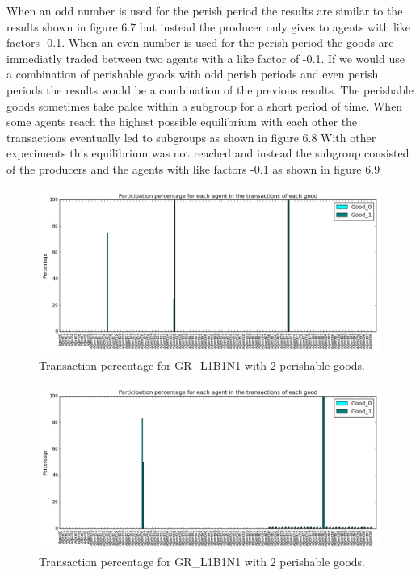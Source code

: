 \documentclass[twoside,openright]{uva-bachelor-thesis}
\begin{document}
When an odd number is used for the perish period the results are similar to the results shown in figure 6.7 but instead the producer only gives to agents with like factors -0.1. When an even number is used for the perish period the goods are immediatly traded between two agents with a like factor of -0.1. If we would use a combination of perishable goods with odd perish periods and even perish periods the results would be a combination of the previous results. The perishable goods sometimes take palce within a subgroup for a short period of time. When some agents reach the highest possible equilibrium with each other the transactions eventually led to subgroups as shown in figure 6.8 With other experiments this equilibrium was not reached and instead the subgroup consisted of the producers and the agents with like factors -0.1 as shown in figure 6.9 \\
\begin{figure}[h!]
  \centering
\includegraphics[scale=0.4]{Simulation_figures/GR_L1B1N1/2perishable_2233_100k}
  \caption{Transaction percentage for GR\_L1B1N1 with 2 perishable goods.}
\end{figure}
\begin{figure}[h!]
  \centering
    \includegraphics[scale=0.4]{Simulation_figures/GR_L1B1N1/2perishable_largercommunity}
  \caption{Transaction percentage for GR\_L1B1N1 with 2 perishable goods.}
\end{figure}
\end{document}
